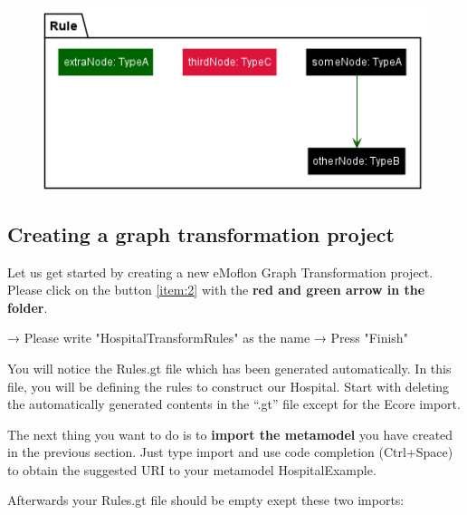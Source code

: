 \begin{figure}[h]
    \centering
    \includegraphics[scale=0.8]{pictures/rule.png}
    \caption{}
    \label{rule}
\end{figure}

\clearpage

\subsection{Creating a graph transformation project}

Let us get started by creating a new eMoflon Graph Transformation project. Please click on the button \ref{item:2} with the \textbf{red and green arrow in the folder}.\newline\newline

\centering

→ Please write \textsf{"HospitalTransformRules"} as the name → Press \textsf{"Finish"} \newline\newline

\raggedright

You will notice the \textsf{Rules.gt} file which has been generated automatically. In this file, you will be defining the rules to construct our Hospital.\newline
Start with deleting the automatically generated contents in the “.gt” file except for the Ecore import.

The next thing you want to do is to \textbf{import the metamodel} you have created in the previous section. Just type import and use code completion (Ctrl+Space) to obtain the suggested URI to your metamodel HospitalExample.\newline

Afterwards your \textsf{Rules.gt} file should be empty exept these two imports:\newline

